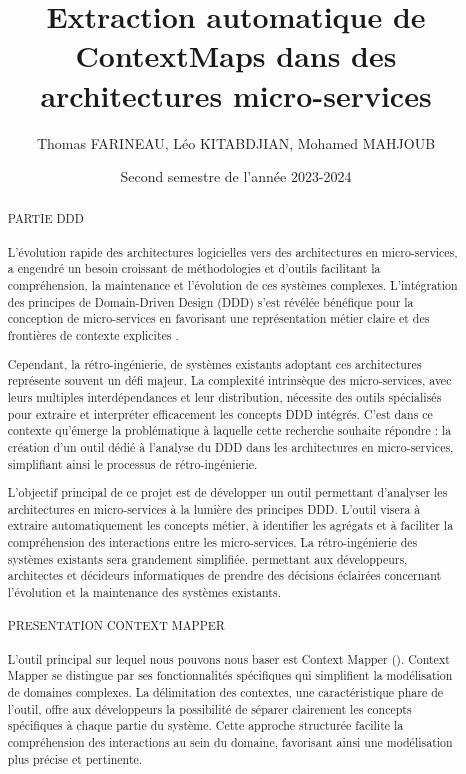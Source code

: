 \documentclass{rapport}
\title{Extraction automatique de ContextMaps dans des architectures micro-services}
\author{Thomas FARINEAU, Léo KITABDJIAN, Mohamed MAHJOUB}
\date{Second semestre de l'année 2023-2024}
\begin{document}
  \maketitle
    \begin{abstract}
PARTIE DDD
\\\\

L'évolution rapide des architectures logicielles vers des architectures en micro-services, a engendré un besoin croissant de méthodologies et d'outils facilitant la compréhension, la maintenance et l'évolution de ces systèmes complexes. L'intégration des principes de Domain-Driven Design (DDD) s'est révélée bénéfique pour la conception de micro-services en favorisant une représentation métier claire et des frontières de contexte explicites \citet{articleDDD}.

Cependant, la rétro-ingénierie, de systèmes existants adoptant ces architectures représente souvent un défi majeur. La complexité intrinsèque des micro-services, avec leurs multiples interdépendances et leur distribution, nécessite des outils spécialisés pour extraire et interpréter efficacement les concepts DDD intégrés. C'est dans ce contexte qu'émerge la problématique à laquelle cette recherche souhaite répondre : la création d'un outil dédié à l'analyse du DDD dans les architectures en micro-services, simplifiant ainsi le processus de rétro-ingénierie.

L'objectif principal de ce projet est de développer un outil permettant d'analyser les architectures en micro-services à la lumière des principes DDD. L'outil visera à extraire automatiquement les concepts métier, à identifier les agrégats et à faciliter la compréhension des interactions entre les micro-services. La rétro-ingénierie des systèmes existants sera grandement simplifiée, permettant aux développeurs, architectes et décideurs informatiques de prendre des décisions éclairées concernant l'évolution et la maintenance des systèmes existants.\\\\
PRESENTATION CONTEXT MAPPER
\\\\
L'outil principal sur lequel nous pouvons nous baser est Context Mapper (\citet{contextmapper}). Context Mapper se distingue par ses fonctionnalités spécifiques qui simplifient la modélisation de domaines complexes. La délimitation des contextes, une caractéristique phare de l'outil, offre aux développeurs la possibilité de séparer clairement les concepts spécifiques à chaque partie du système. Cette approche structurée facilite la compréhension des interactions au sein du domaine, favorisant ainsi une modélisation plus précise et pertinente.


\end{abstract}
\end{document}
